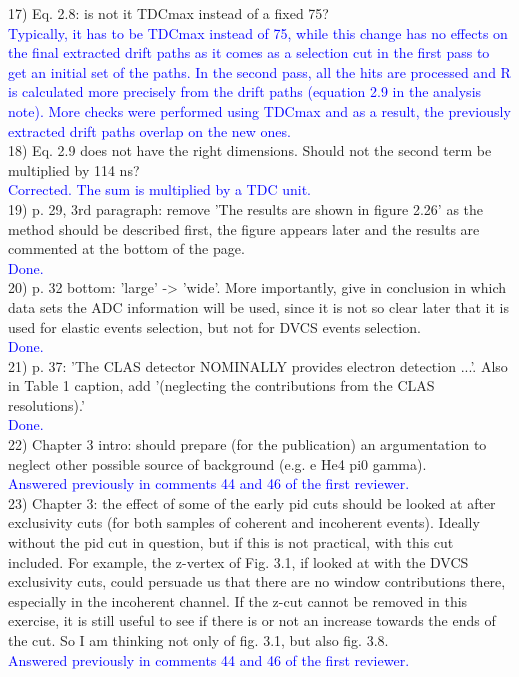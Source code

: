 17) Eq. 2.8: is not it TDCmax instead of a fixed 75?\\
\textcolor{blue}{Typically, it has to be TDCmax instead of 75, while this 
   change has no effects on the final extracted drift paths as it comes as a 
selection cut in the first pass to get an initial set of the paths. In the 
second pass, all the hits are processed and R is calculated more precisely from 
the drift paths (equation 2.9 in the analysis note). More checks were performed 
using TDCmax and as a result, the previously extracted drift paths overlap on 
the new ones.}\\

18) Eq. 2.9 does not have the right dimensions. Should not the second term be 
multiplied by 114 ns? \\
\textcolor{blue}{ Corrected. The sum is multiplied by a TDC unit.}\\

19) p. 29, 3rd paragraph: remove 'The results are shown in figure 2.26' as the 
method should be described first, the figure appears later and the results are 
commented at the bottom of the page. \\
\textcolor{blue}{  Done.}\\

20) p. 32 bottom: 'large' -> 'wide'. More importantly, give in conclusion in which 
data sets the ADC information will be used, since it is not so clear later that 
it is used for elastic events selection, but not for DVCS events selection. \\
\textcolor{blue}{  Done.}\\

21) p. 37: 'The CLAS detector NOMINALLY provides electron detection ...'. Also 
in Table 1 caption, add '(neglecting the contributions from the CLAS 
resolutions).'\\
\textcolor{blue}{  Done.}\\

22) Chapter 3 intro: should prepare (for the publication) an argumentation to 
neglect other possible source of background (e.g. e He4 pi0 gamma). \\
\textcolor{blue}{ Answered previously in comments 44 and 46 of the first 
reviewer.}\\

23) Chapter 3: the effect of some of the early pid cuts should be looked at after 
exclusivity cuts (for both samples of coherent and incoherent events). Ideally 
without the pid cut in question, but if this is not practical, with this cut 
included. For example, the z-vertex of Fig. 3.1, if looked at with the DVCS 
exclusivity cuts, could persuade us that there are no window contributions 
there, especially in the incoherent channel. If the z-cut cannot be removed in 
this exercise, it is still useful to see if there is or not an increase towards 
the ends of the cut. So I am thinking not only of fig. 3.1, but also fig. 3.8. \\
\textcolor{blue}{ Answered previously in comments 44 and 46 of the first 
reviewer.}\\

